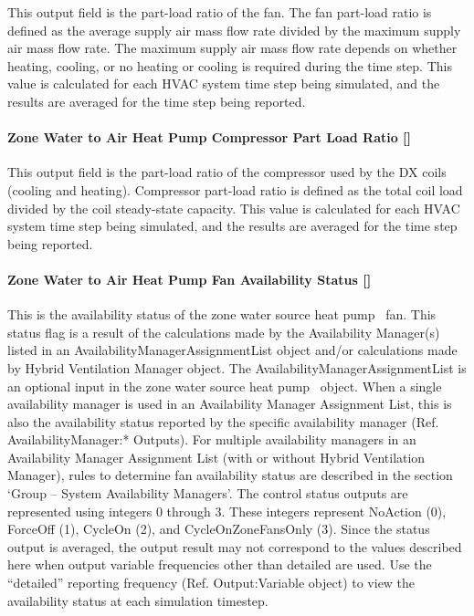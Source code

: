 This output field is the part-load ratio of the fan. The fan part-load ratio is defined as the average supply air mass flow rate divided by the maximum supply air mass flow rate. The maximum supply air mass flow rate depends on whether heating, cooling, or no heating or cooling is required during the time step. This value is calculated for each HVAC system time step being simulated, and the results are averaged for the time step being reported.

\paragraph{Zone Water to Air Heat Pump Compressor Part Load Ratio {[]}}\label{zone-water-to-air-heat-pump-compressor-part-load-ratio}

This output field is the part-load ratio of the compressor used by the DX coils (cooling and heating). Compressor part-load ratio is defined as the total coil load divided by the coil steady-state capacity. This value is calculated for each HVAC system time step being simulated, and the results are averaged for the time step being reported.

\paragraph{Zone Water to Air Heat Pump Fan Availability Status {[]}}\label{zone-water-to-air-heat-pump-fan-availability-status}

This is the availability status of the zone water source heat pump~ fan. This status flag is a result of the calculations made by the Availability Manager(s) listed in an AvailabilityManagerAssignmentList object and/or calculations made by Hybrid Ventilation Manager object. The AvailabilityManagerAssignmentList is an optional input in the zone water source heat pump~ object. When a single availability manager is used in an Availability Manager Assignment List, this is also the availability status reported by the specific availability manager (Ref. AvailabilityManager:* Outputs). For multiple availability managers in an Availability Manager Assignment List (with or without Hybrid Ventilation Manager), rules to determine fan availability status are described in the section `Group -- System Availability Managers'. The control status outputs are represented using integers 0 through 3. These integers represent NoAction (0), ForceOff (1), CycleOn (2), and CycleOnZoneFansOnly (3). Since the status output is averaged, the output result may not correspond to the values described here when output variable frequencies other than detailed are used. Use the ``detailed'' reporting frequency (Ref. Output:Variable object) to view the availability status at each simulation timestep.

